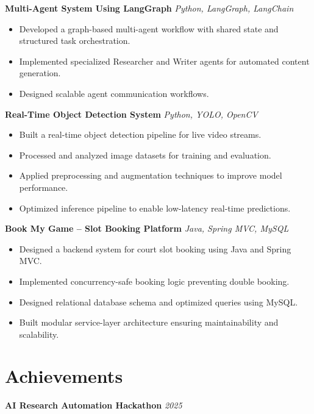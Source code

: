 \documentclass[10pt]{article}
\begin{document}
\textbf{Multi-Agent System Using LangGraph} \hfill \textit{Python, LangGraph, LangChain}

\begin{itemize}[leftmargin=*, itemsep=2pt]
\item Developed a graph-based multi-agent workflow with shared state and structured task orchestration.
\item Implemented specialized Researcher and Writer agents for automated content generation.
\item Designed scalable agent communication workflows.
\end{itemize}

\textbf{Real-Time Object Detection System} \hfill \textit{Python, YOLO, OpenCV}

\begin{itemize}[leftmargin=*, itemsep=2pt]
\item Built a real-time object detection pipeline for live video streams.
\item Processed and analyzed image datasets for training and evaluation.
\item Applied preprocessing and augmentation techniques to improve model performance.
\item Optimized inference pipeline to enable low-latency real-time predictions.
\end{itemize}

\textbf{Book My Game – Slot Booking Platform} \hfill \textit{Java, Spring MVC, MySQL}

\begin{itemize}[leftmargin=*, itemsep=2pt]
\item Designed a backend system for court slot booking using Java and Spring MVC.
\item Implemented concurrency-safe booking logic preventing double booking.
\item Designed relational database schema and optimized queries using MySQL.
\item Built modular service-layer architecture ensuring maintainability and scalability.
\end{itemize}

\section*{Achievements}

\textbf{AI Research Automation Hackathon} \hfill \textit{2025}
\end{document}
